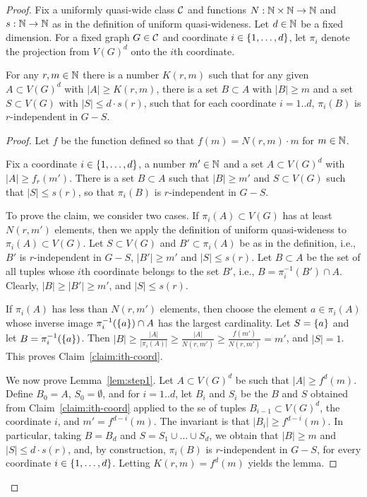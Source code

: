 \begin{proof}Fix a uniformly quasi-wide class $\cal C$ and functions $N:\N\times\N\to \N$
	and $s:\N\to\N$ as in the definition of uniform quasi-wideness.
	Let $d\in \N$ be a fixed dimension.
		For a fixed graph $G\in \cal C$  and
	  coordinate $i\in\set{1,\ldots,d}$, let $\pi_i$ denote the projection from $V(G)^d$ onto the $i$th coordinate.

	


\begin{lemma}\label{lem:step1} For any $r,m\in \N$ there is a number $K(r,m)$ such that
	for any given $A\subset V(G)^d$ with $|A|\ge K(r,m)$,
	there is a set $B\subset A$ with $|B|\ge m$ and a set $S\subset V(G)$ with $|S|\le d\cdot s(r)$, 
	such that for each coordinate $i=1..d$, 
 $\pi_i(B)$ is $r$-independent in $G-S$. 
\end{lemma}
\begin{proof}

Let $f$ be the function defined so that $f(m)=N(r,m)\cdot m$ for $m\in\N$.

\begin{claim}\label{claim:ith-coord}
Fix a coordinate $i\in\set{1,\ldots,d}$, a number $m'\in\N$ and a  set $A\subset V(G)^d$ with  $|A|\ge f_r(m')$.
There is a set $B\subset A$ such that $|B|\ge m'$
and $S\subset V(G)$ such that $|S|\le  s(r)$,
so that  $\pi_i(B)$ is $r$-independent in $G-S$.	
\end{claim}
To prove the claim, 
we consider two cases.
If $\pi_i(A)\subset V(G)$ has at least $N(r,m')$ elements, then we apply the definition of uniform quasi-wideness to $\pi_i(A)\subset V(G)$. Let $S\subset V(G)$ and $B'\subset \pi_i(A)$
be as in the definition, i.e., $B'$ is $r$-independent in $G-S$,
$|B'|\ge m'$ and $|S|\le s(r)$. Let $B\subset A$ be the set of all tuples 
whose $i$th coordinate belongs to the set $B'$, i.e., $B=\pi_i^{-1}(B')\cap A$.
Clearly, $|B|\ge |B'|\ge m'$, and $|S|\le s(r)$.

If $\pi_i(A)$ has less than $N(r,m')$ elements, then choose the element $a\in\pi_i(A)$ whose inverse image $\pi_i^{-1}(\set a)\cap A$ has the largest cardinality. Let $S=\set{a}$ 
and let $B=\pi_i^{-1}(\set a)$. Then $|B|\ge \frac{|A|}{|\pi_i(A)|}\ge \frac{|A|}{N(r,m')}\ge \frac {f(m')}{N(r,m')}=m'$,
and $|S|=1$. This proves Claim~\ref{claim:ith-coord}.


We now prove Lemma~\ref{lem:step1}.
Let $A\subset V(G)^d$ be such that $|A|\ge f^d(m)$. 
Define $B_0=A$, $S_0=\emptyset$, and for $i=1..d$,
let $B_{i}$ and $S_i$ be the $B$ and $S$ obtained from  Claim~\ref{claim:ith-coord} applied to the se of tuples $B_{i-1}\subset V(G)^d$, the coordinate $i$, and $m'=f^{d-i}(m)$.  The invariant is that $|B_i|\ge f^{d-i}(m)$.
In particular, 
taking $B=B_d$ and $S=S_1\cup\ldots \cup S_d$, we obtain that $|B|\ge m$ and $|S|\le d\cdot s(r)$, and, by construction, $\pi_i(B)$
is $r$-independent in $G-S$, for every coordinate $i\in\set{1,\ldots,d}$. Letting $K(r,m)=f^d(m)$ yields the lemma.
\end{proof}



\end{proof}
